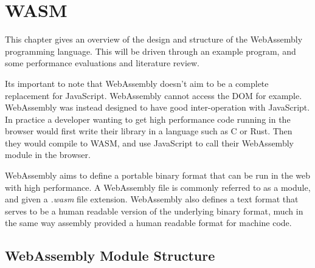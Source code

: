 \documentclass[11pt]{book}
\begin{document}
\chapter{WASM}
This chapter gives an overview of the design and structure of the WebAssembly programming language. This will be driven through an example program, and some performance evaluations and literature review. 



Its important to note that WebAssembly doesn't aim to be a complete replacement for JavaScript. WebAssembly cannot access the DOM for example. WebAssembly was instead designed to have good inter-operation with JavaScript. In practice a developer wanting to get high performance code running in the browser would first write their library in a language such as C or Rust. Then they would compile to WASM, and use JavaScript to call their WebAssembly module in the browser. 




WebAssembly aims to define a portable binary format that can be run in the web with high performance. A WebAssembly file is commonly referred to as a module, and given a \textit{.wasm} file extension. WebAssembly also defines a text format that serves to be a human readable version of the underlying binary format, much in the same way assembly provided a human readable format for machine code. 



\section{WebAssembly Module Structure}
\end{document}
